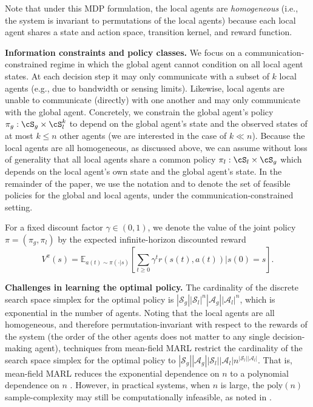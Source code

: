 Note that under this MDP formulation, the local agents are \emph{homogeneous} (i.e., the system is invariant to permutations of the local agents) because each local agent shares a state and action space, transition kernel, and reward function. 
 
\textbf{Information constraints and policy classes.} 
We focus on a communication-constrained regime in which the global agent cannot condition on all local agent states.
At each decision step it may only communicate with a subset of $k$ local agents (e.g., due to bandwidth or sensing limits). Likewise, local agents are unable to communicate (directly) with one another and may only communicate with the global agent. Concretely, we constrain the global agent's policy $\pi_g: \cS_g \times \cS_l^k$ to depend on the global agent's state and the observed states of at most $k \leq n$ other agents (we are interested in the case of $k \ll n$). Because the local agents are all homogeneous, as discussed above, we can assume without loss of generality that all local agents share a common policy $\pi_l: \cS_l \times \cS_g$ which depends on the local agent's own state and the global agent's state. In the remainder of the paper, we use the notation  and  to denote the set of feasible policies for the global and local agents, under the communication-constrained setting. 

For a fixed discount factor $\gamma\in(0,1)$, we denote the value of the joint policy $\pi = (\pi_g, \pi_l)$ by the expected infinite-horizon discounted reward
\begin{equation}
    V^\pi(s)\!=\!\mathbb{E}_{a(t) \sim \pi(\cdot | s)} \left[ \sum_{t \geq 0} \gamma^t r(s(t), a(t)) \Big\lvert s(0) = s \right]\!\!.
\end{equation}

\textbf{Challenges in learning the optimal policy.} The cardinality of the discrete search space simplex for the optimal policy is $|\mathcal{S}_g||\mathcal{S}_l|^n|\mathcal{A}_g||\mathcal{A}_l|^n$, which is exponential in the number of agents. Noting that the local agents are all homogeneous, and therefore permutation-invariant with respect to the rewards of the system (the order of the other agents does not matter to any single decision-making agent), techniques from mean-field MARL restrict the cardinality of the search space simplex for the optimal policy to $|\mathcal{S}_g||\mathcal{A}_g||\mathcal{S}_l||\mathcal{A}_l|n^{|\mathcal{S}_l||\mathcal{A}_l|}$. That is, mean-field MARL reduces the exponential dependence on $n$ to a polynomial dependence on $n$ \cite{yang2020meanfieldmultiagentreinforcement,gu2021meanfieldcontrolsqlearningcooperative,anand2025meanfield}. However, in practical systems, when $n$ is large, the $\mathrm{poly}(n)$ sample-complexity may still be computationally infeasible, as noted in \citet{anand2025meanfield}. 

